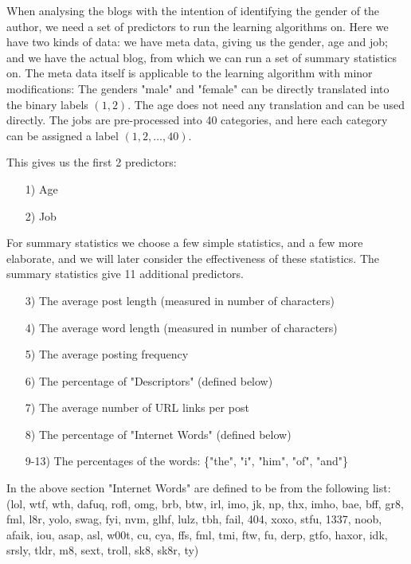 \documentclass[a4paper,11pt]{article}
\begin{document}
\noindent When analysing the blogs with the intention of identifying the gender of the author, we need a set of predictors to run the learning algorithms on. Here we have two kinds of data: we have meta data, giving us the gender, age and job; and we have the actual blog, from which we can run a set of summary statistics on.
The meta data itself is applicable to the learning algorithm with minor modifications: The genders "male" and "female" can be directly translated into the binary labels $(1,2)$. The age does not need any translation and can be used directly. The jobs are pre-processed into 40 categories, and here each category can be assigned a label $(1,2,\dots,40)$.

\noindent This gives us the first 2 predictors:
\begin{enumerate}
	\item[1)] Age\vspace{-1em}
	\item[2)] Job
\end{enumerate}

\noindent For summary statistics we choose a few simple statistics, and a few more elaborate, and we will later consider the effectiveness of these statistics. The summary statistics give 11 additional predictors.
\begin{enumerate}
	\item[3)] The average post length (measured in number of characters)\vspace{-1em}
	\item[4)] The average word length (measured in number of characters)\vspace{-1em}
	\item[5)] The average posting frequency\vspace{-1em}
	\item[6)] The percentage of "Descriptors" (defined below)\vspace{-1em}
	\item[7)] The average number of URL links per post\vspace{-1em}
	\item[8)] The percentage of "Internet Words" (defined below)\vspace{-1em}
	\item[9-13)] The percentages of the words: \{"the", "i", "him", "of", "and"\}
\end{enumerate}

\noindent In the above section "Internet Words" are defined to be from the following list:
(lol, wtf, wth, dafuq, rofl, omg, brb, btw, irl, imo, jk, np, thx, imho, bae, bff, gr8, fml, l8r, yolo, swag, fyi, nvm, glhf, lulz, tbh, fail, 404, xoxo, stfu, 1337, noob, afaik, iou, asap, asl, w00t, cu, cya, ffs, fml, tmi, ftw, fu, derp, gtfo, haxor, idk, srsly, tldr, m8, sext, troll, sk8, sk8r, ty)
\end{document}

